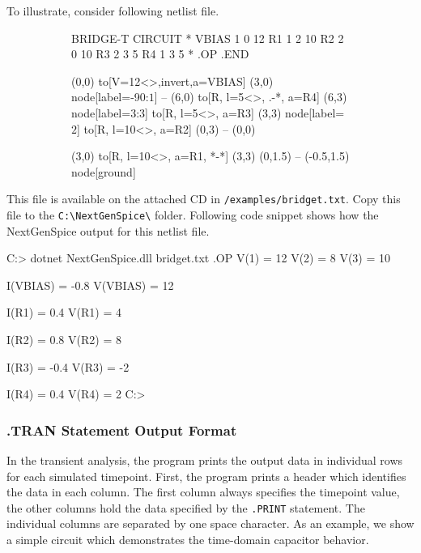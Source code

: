 To illustrate, consider following netlist file.

\begin{figure}[h]
	\centering
	\begin{subfigure}{.25\textwidth}
		\begin{spicecode}
BRIDGE-T CIRCUIT
*
VBIAS 1 0 12
R1 1 2 10
R2 2 0 10
R3 2 3 5
R4 1 3 5
*
.OP
.END
		\end{spicecode}		
	\end{subfigure}\hspace{5mm}
	\begin{subfigure}{.7\textwidth}	
		\centering	
		\begin{circuitdev}
			(0,0) 
			to[V=12<\volt>,invert,a=VBIAS] (3,0) node[label={-90:$1$}]{}
			-- (6,0)
			to[R, l=5<\ohm>, .-*, a=R4] (6,3) node[label={3:$3$}]{}
			to[R, l=5<\ohm>, a=R3] (3,3) node[label={$2$}]{}
			to[R, l=10<\ohm>, a=R2] (0,3)
			-- (0,0)
			
			(3,0) to[R, l=10<\ohm>, a=R1, *-*] (3,3)
			(0,1.5) -- (-0.5,1.5) node[ground]{}
		\end{circuitdev}
	\end{subfigure}	
\end{figure}

This file is available on the attached CD in \texttt{/examples/bridget.txt}. Copy this file to the \texttt{C:\textbackslash{}NextGenSpice\textbackslash} folder. Following code snippet shows how the NextGenSpice output for this netlist file.

\begin{code}
C:\NextGenSpice> dotnet NextGenSpice.dll bridget.txt
.OP
V(1) = 12
V(2) = 8
V(3) = 10

I(VBIAS) = -0.8
V(VBIAS) = 12

I(R1) = 0.4
V(R1) = 4

I(R2) = 0.8
V(R2) = 8

I(R3) = -0.4
V(R3) = -2

I(R4) = 0.4
V(R4) = 2
C:\NextGenSpice>
\end{code}

\subsubsection{.TRAN Statement Output Format}
In the transient analysis, the program prints the output data in individual rows for each simulated timepoint. First, the program prints a header which identifies the data in each column. The first column always specifies the timepoint value, the other columns hold the data specified by the \texttt{.PRINT} statement. The individual columns are separated by one space character. As an example, we show a simple circuit which demonstrates the time-domain capacitor behavior.

